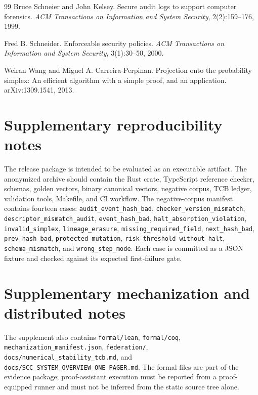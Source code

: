 \documentclass{article}
\newcommand{\gate}[1]{\texttt{\nolinkurl{#1}}}
\begin{document}
\begin{thebibliography}{99}
Bruce Schneier and John Kelsey. Secure audit logs to support computer forensics. \emph{ACM Transactions on Information and System Security}, 2(2):159--176, 1999.

Fred B. Schneider. Enforceable security policies. \emph{ACM Transactions on Information and System Security}, 3(1):30--50, 2000.

Weiran Wang and Miguel A. Carreira-Perpinan. Projection onto the probability simplex: An efficient algorithm with a simple proof, and an application. arXiv:1309.1541, 2013.
\end{thebibliography}

\clearpage
\appendix
\section{Supplementary reproducibility notes}
The release package is intended to be evaluated as an executable artifact. The anonymized archive should contain the Rust crate, TypeScript reference checker, schemas, golden vectors, binary canonical vectors, negative corpus, TCB ledger, validation tools, Makefile, and CI workflow. The negative-corpus manifest contains fourteen cases: \gate{audit_event_hash_bad}, \gate{checker_version_mismatch}, \gate{descriptor_mismatch_audit}, \gate{event_hash_bad}, \gate{halt_absorption_violation}, \gate{invalid_simplex}, \gate{lineage_erasure}, \gate{missing_required_field}, \gate{next_hash_bad}, \gate{prev_hash_bad}, \gate{protected_mutation}, \gate{risk_threshold_without_halt}, \gate{schema_mismatch}, and \gate{wrong_step_mode}. Each case is committed as a JSON fixture and checked against its expected first-failure gate.

\section{Supplementary mechanization and distributed notes}
The supplement also contains \gate{formal/lean}, \gate{formal/coq}, \gate{mechanization\_manifest.json}, \gate{federation/}, \gate{docs/numerical\_stability\_tcb.md}, and \gate{docs/SCC\_SYSTEM\_OVERVIEW\_ONE\_PAGER.md}. The formal files are part of the evidence package; proof-assistant execution must be reported from a proof-equipped runner and must not be inferred from the static source tree alone.


\end{document}
